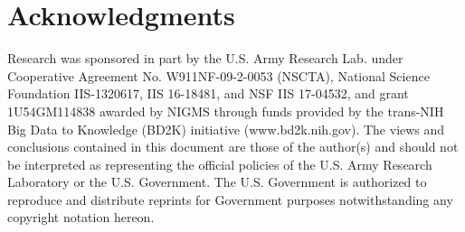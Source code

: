 \section{Acknowledgments}
\label{sect:ack}

Research was sponsored in part by the U.S. Army Research Lab. under Cooperative Agreement No. W911NF-09-2-0053 (NSCTA), National Science Foundation IIS-1320617, IIS 16-18481, and NSF IIS 17-04532, and grant 1U54GM114838 awarded by NIGMS through funds provided by the trans-NIH Big Data to Knowledge (BD2K) initiative (www.bd2k.nih.gov). The views and conclusions contained in this document are those of the author(s) and should not be interpreted as representing the official policies of the U.S. Army Research Laboratory or the U.S. Government. The U.S. Government is authorized to reproduce and distribute reprints for Government purposes notwithstanding any copyright notation hereon.